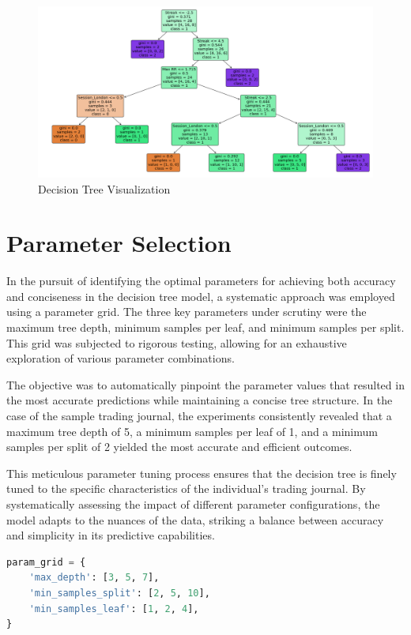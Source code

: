 \documentclass{article}
\begin{document}
\begin{figure}[ht]
    \centering
    \includegraphics[width=1\linewidth]{decision_tree_visualizatoin.png}
    \caption{Decision Tree Visualization}
    \label{fig:enter-label}
\end{figure}


\section{Parameter Selection}
In the pursuit of identifying the optimal parameters for achieving both accuracy and conciseness in the decision tree model, a systematic approach was employed using a parameter grid. The three key parameters under scrutiny were the maximum tree depth, minimum samples per leaf, and minimum samples per split. This grid was subjected to rigorous testing, allowing for an exhaustive exploration of various parameter combinations.

The objective was to automatically pinpoint the parameter values that resulted in the most accurate predictions while maintaining a concise tree structure. In the case of the sample trading journal, the experiments consistently revealed that a maximum tree depth of 5, a minimum samples per leaf of 1, and a minimum samples per split of 2 yielded the most accurate and efficient outcomes.

This meticulous parameter tuning process ensures that the decision tree is finely tuned to the specific characteristics of the individual's trading journal. By systematically assessing the impact of different parameter configurations, the model adapts to the nuances of the data, striking a balance between accuracy and simplicity in its predictive capabilities.

\begin{lstlisting}[language=Python, caption={Creating Test Parameter Grid}, label={lst:python}]
param_grid = {
    'max_depth': [3, 5, 7],
    'min_samples_split': [2, 5, 10],
    'min_samples_leaf': [1, 2, 4],
}
\end{lstlisting}
\end{document}

